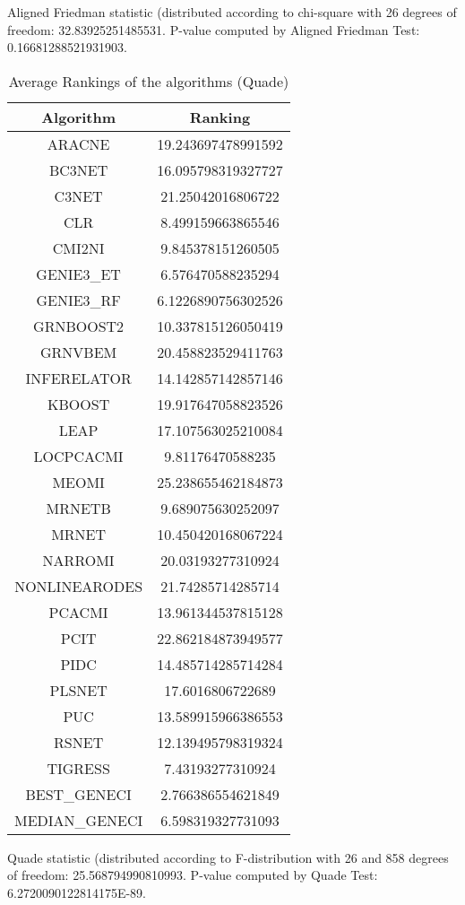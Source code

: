 \documentclass[a4paper,10pt]{article}
\begin{document}
\begin{landscape}
Aligned Friedman statistic (distributed according to chi-square with 26 degrees of freedom: 32.83925251485531. 
P-value computed by Aligned Friedman Test: 0.16681288521931903.\newline


\newpage

\begin{table}[!htp]
\centering
\caption{Average Rankings of the algorithms (Quade)
}\begin{tabular}{c|c}
Algorithm&Ranking\\
\hline
ARACNE&19.243697478991592\\
BC3NET&16.095798319327727\\
C3NET&21.25042016806722\\
CLR&8.499159663865546\\
CMI2NI&9.845378151260505\\
GENIE3_ET&6.576470588235294\\
GENIE3_RF&6.1226890756302526\\
GRNBOOST2&10.337815126050419\\
GRNVBEM&20.458823529411763\\
INFERELATOR&14.142857142857146\\
KBOOST&19.917647058823526\\
LEAP&17.107563025210084\\
LOCPCACMI&9.81176470588235\\
MEOMI&25.238655462184873\\
MRNETB&9.689075630252097\\
MRNET&10.450420168067224\\
NARROMI&20.03193277310924\\
NONLINEARODES&21.74285714285714\\
PCACMI&13.961344537815128\\
PCIT&22.862184873949577\\
PIDC&14.485714285714284\\
PLSNET&17.6016806722689\\
PUC&13.589915966386553\\
RSNET&12.139495798319324\\
TIGRESS&7.43193277310924\\
BEST_GENECI&2.766386554621849\\
MEDIAN_GENECI&6.598319327731093\\
\end{tabular}
\end{table}
Quade statistic (distributed according to F-distribution with 26 and 858 degrees of freedom: 25.568794990810993. 
P-value computed by Quade Test: 6.2720090122814175E-89.\newline



\end{landscape}
\end{document}
